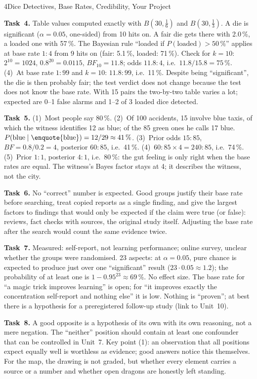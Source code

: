 \begin{uebungsblattb}{4}{Dice Detectives, Base Rates, Credibility, Your Project}
\begin{lehrhinweis}
\textbf{Task~4.} Table values computed exactly with $B(30,\tfrac16)$ and
$B(30,\tfrac13)$. A die is significant ($\alpha=0.05$, one-sided) from
10 hits on. A fair die gets there with 2.0\,\%, a loaded one with
57\,\%. The Bayesian rule \enquote{loaded if $P(\text{loaded})>50\,\%$}
applies at base rate $1:4$ from 9 hits on (fair: 5.1\,\%, loaded:
71\,\%). Check for $k=10$: $2^{10}=1024$, $0.8^{20}=0.0115$,
$\mathit{BF}_{10}=11.8$; odds $11.8:4$, i.e.\ $11.8/15.8=75\,\%$.
(4)~At base rate $1:99$ and $k=10$: $11.8:99$, i.e.\ 11\,\%. Despite
being \enquote{significant}, the die is then probably fair; the test
verdict does not change because the test does not know the base rate.
With 15 pairs the two-by-two table varies a lot; expected are 0--1 false
alarms and 1--2 of 3 loaded dice detected.

\textbf{Task~5.} (1)~Most people say 80\,\%. (2)~Of 100 accidents, 15
involve blue taxis, of which the witness identifies 12 as blue; of the 85
green ones he calls 17 blue.
$P(\text{blue}\mid\text{\enquote{blue}})=12/29\approx41\,\%$. (3)~Prior
odds $15:85$, $\mathit{BF}=0.8/0.2=4$, posterior $60:85$, i.e.\ 41\,\%.
(4)~$60:85\times4=240:85$, i.e.\ 74\,\%. (5)~Prior $1:1$, posterior
$4:1$, i.e.\ 80\,\%: the gut feeling is only right when the base rates
are equal. The witness's Bayes factor stays at 4; it describes the
witness, not the city.

\textbf{Task~6.} No \enquote{correct} number is expected. Good groups
justify their base rate before searching, treat copied reports as a
single finding, and give the largest factors to findings that would only
be expected if the claim were true (or false): reviews, fact checks with
sources, the original study itself. Adjusting the base rate after the
search would count the same evidence twice.

\textbf{Task~7.} Measured: self-report, not learning performance; online
survey, unclear whether the groups were randomised. 23 aspects: at
$\alpha=0.05$, pure chance is expected to produce just over one
\enquote{significant} result ($23\cdot0.05\approx1.2$); the probability of
at least one is $1-0.95^{23}\approx69\,\%$. No effect size. The base rate
for \enquote{a magic trick improves learning} is open; for \enquote{it
improves exactly the concentration self-report and nothing else} it is
low. Nothing is \enquote{proven}; at best there is a hypothesis for a
preregistered follow-up study (link to Unit~10).

\textbf{Task~8.} A good opposite is a hypothesis of its own with its own
reasoning, not a mere negation. The \enquote{neither} position should
contain at least one confounder that can be controlled in Unit~7. Key
point (1): an observation that all positions expect equally well is
worthless as evidence; good answers notice this themselves. For the map,
the drawing is not graded, but whether every element carries a source or
a number and whether open dragons are honestly left standing.


\end{lehrhinweis}
\end{uebungsblattb}
